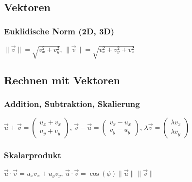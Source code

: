 \documentclass{article}
\begin{document}
\pagestyle{fancy}
\fancyhead{} %

\fancyfoot{} %

\subsection*{Vektoren}
\subsubsection*{Euklidische Norm (2D, 3D)}
\begin{center}
        \hspace{0.3cm}$\|\vec{v}\| =  \sqrt{v_x^2 + v_y^2}$,
        \hspace{0.3cm}$\|\vec{v}\| =  \sqrt{v_x^2 + v_y^2 + v_z^2}$
        \vspace{0.2cm}	
\end{center}

\subsection*{Rechnen mit Vektoren}
\subsubsection*{Addition, Subtraktion, Skalierung}
\begin{center}
	$\vec{u} + \vec{v} = \begin{pmatrix}u_x + v_x\\ u_y + v_y\end{pmatrix}$,
$\vec{v} - \vec{u} = \begin{pmatrix}v_x - u_x\\ v_y - u_y\end{pmatrix}$,
$\lambda \vec{v} = \begin{pmatrix}\lambda v_x\\ \lambda v_y\end{pmatrix}$\\	
\end{center}
\subsubsection*{Skalarprodukt}
\begin{center}
	$\vec{u}\cdot\vec{v} = u_xv_x + u_yv_y$, $\vec{u} \cdot \vec{v} = \cos(\phi)\|\vec{u}\|\|\vec{v}\|$ \vspace*{0.2cm}	
\end{center}
\end{document}
